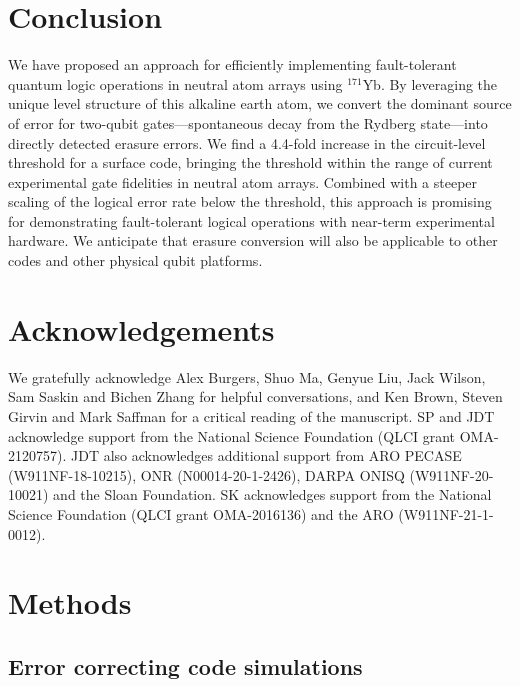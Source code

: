 \documentclass[%
reprint,
superscriptaddress,
 amsmath,amssymb,
 aps,
 prx,
floatfix,
]{revtex4-1}
\begin{document}
\section{Conclusion}

We have proposed an approach for efficiently implementing fault-tolerant quantum logic operations in neutral atom arrays using ${}^{171}$Yb. By leveraging the unique level structure of this alkaline earth atom, we convert the dominant source of error for two-qubit gates---spontaneous decay from the Rydberg state---into directly detected erasure errors. We find a 4.4-fold increase in the circuit-level threshold for a surface code, bringing the threshold within the range of current experimental gate fidelities in neutral atom arrays. Combined with a steeper scaling of the logical error rate below the threshold, this approach is promising for demonstrating fault-tolerant logical operations with near-term experimental hardware. We anticipate that erasure conversion will also be applicable to other codes and other physical qubit platforms.

\section{Acknowledgements}
We gratefully acknowledge Alex Burgers, Shuo Ma, Genyue Liu, Jack Wilson, Sam Saskin and Bichen Zhang for helpful conversations, and Ken Brown, Steven Girvin and Mark Saffman for a critical reading of the manuscript. SP and JDT acknowledge support from the National Science Foundation (QLCI grant OMA-2120757). JDT also acknowledges additional support from ARO PECASE (W911NF-18-10215), ONR (N00014-20-1-2426), DARPA ONISQ (W911NF-20-10021) and the Sloan Foundation. SK acknowledges support from the National Science Foundation (QLCI grant OMA-2016136) and the ARO (W911NF-21-1-0012).



\section{Methods}
\subsection{Error correcting code simulations}
\end{document}
